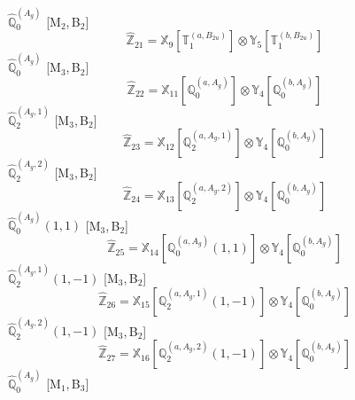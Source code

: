 \documentclass[fleqn,10pt,landscape]{article}
\begin{document}
\begin{itemize}
\noindent {} $\,\,\,\hat{\mathbb{Q}}_{0}^{(A_{g})}$ [M$_{2}$,\,B$_{2}$]
\begin{dmath*}
\hat{\mathbb{Z}}_{21}=\mathbb{X}_{9}[\mathbb{T}_{1}^{(a,B_{2u})}] \otimes\mathbb{Y}_{5}[\mathbb{T}_{1}^{(b,B_{2u})}]
\end{dmath*}
\vspace{4mm}
\noindent {} $\,\,\,\hat{\mathbb{Q}}_{0}^{(A_{g})}$ [M$_{3}$,\,B$_{2}$]
\begin{dmath*}
\hat{\mathbb{Z}}_{22}=\mathbb{X}_{11}[\mathbb{Q}_{0}^{(a,A_{g})}] \otimes\mathbb{Y}_{4}[\mathbb{Q}_{0}^{(b,A_{g})}]
\end{dmath*}
\vspace{4mm}
\noindent {} $\,\,\,\hat{\mathbb{Q}}_{2}^{(A_{g},1)}$ [M$_{3}$,\,B$_{2}$]
\begin{dmath*}
\hat{\mathbb{Z}}_{23}=\mathbb{X}_{12}[\mathbb{Q}_{2}^{(a,A_{g},1)}] \otimes\mathbb{Y}_{4}[\mathbb{Q}_{0}^{(b,A_{g})}]
\end{dmath*}
\vspace{4mm}
\noindent {} $\,\,\,\hat{\mathbb{Q}}_{2}^{(A_{g},2)}$ [M$_{3}$,\,B$_{2}$]
\begin{dmath*}
\hat{\mathbb{Z}}_{24}=\mathbb{X}_{13}[\mathbb{Q}_{2}^{(a,A_{g},2)}] \otimes\mathbb{Y}_{4}[\mathbb{Q}_{0}^{(b,A_{g})}]
\end{dmath*}
\vspace{4mm}
\noindent {} $\,\,\,\hat{\mathbb{Q}}_{0}^{(A_{g})}(1,1)$ [M$_{3}$,\,B$_{2}$]
\begin{dmath*}
\hat{\mathbb{Z}}_{25}=\mathbb{X}_{14}[\mathbb{Q}_{0}^{(a,A_{g})}(1,1)] \otimes\mathbb{Y}_{4}[\mathbb{Q}_{0}^{(b,A_{g})}]
\end{dmath*}
\vspace{4mm}
\noindent {} $\,\,\,\hat{\mathbb{Q}}_{2}^{(A_{g},1)}(1,-1)$ [M$_{3}$,\,B$_{2}$]
\begin{dmath*}
\hat{\mathbb{Z}}_{26}=\mathbb{X}_{15}[\mathbb{Q}_{2}^{(a,A_{g},1)}(1,-1)] \otimes\mathbb{Y}_{4}[\mathbb{Q}_{0}^{(b,A_{g})}]
\end{dmath*}
\vspace{4mm}
\noindent {} $\,\,\,\hat{\mathbb{Q}}_{2}^{(A_{g},2)}(1,-1)$ [M$_{3}$,\,B$_{2}$]
\begin{dmath*}
\hat{\mathbb{Z}}_{27}=\mathbb{X}_{16}[\mathbb{Q}_{2}^{(a,A_{g},2)}(1,-1)] \otimes\mathbb{Y}_{4}[\mathbb{Q}_{0}^{(b,A_{g})}]
\end{dmath*}
\vspace{4mm}
\noindent {} $\,\,\,\hat{\mathbb{Q}}_{0}^{(A_{g})}$ [M$_{1}$,\,B$_{3}$]

\end{itemize}
\end{document}
